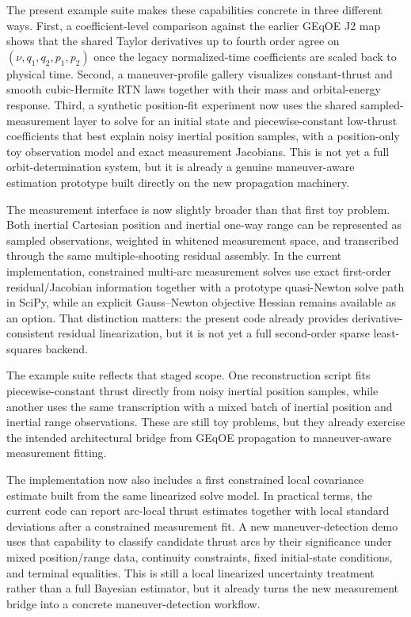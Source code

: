 \documentclass[11pt]{article}
\begin{document}
The present example suite makes these capabilities concrete in three different
ways. First, a coefficient-level comparison against the earlier GEqOE J2 map
shows that the shared Taylor derivatives up to fourth order agree on
$(\nu, q_1, q_2, p_1, p_2)$ once the legacy normalized-time coefficients are
scaled back to physical time. Second, a maneuver-profile gallery visualizes
constant-thrust and smooth cubic-Hermite RTN laws together with their mass and
orbital-energy response. Third, a synthetic position-fit experiment now uses
the shared sampled-measurement layer to solve for an initial state and
piecewise-constant low-thrust coefficients that best explain noisy inertial
position samples, with a position-only toy observation model and exact
measurement Jacobians. This is not yet a full orbit-determination system, but
it is already a genuine maneuver-aware estimation prototype built directly on
the new propagation machinery.

The measurement interface is now slightly broader than that first toy problem.
Both inertial Cartesian position and inertial one-way range can be represented
as sampled observations, weighted in whitened measurement space, and
transcribed through the same multiple-shooting residual assembly. In the
current implementation, constrained multi-arc measurement solves use exact
first-order residual/Jacobian information together with a prototype
quasi-Newton solve path in SciPy, while an explicit Gauss--Newton objective
Hessian remains available as an option. That distinction matters: the present
code already provides derivative-consistent residual linearization, but it is
not yet a full second-order sparse least-squares backend.

The example suite reflects that staged scope. One reconstruction script fits
piecewise-constant thrust directly from noisy inertial position samples, while
another uses the same transcription with a mixed batch of inertial position and
inertial range observations. These are still toy problems, but they already
exercise the intended architectural bridge from GEqOE propagation to
maneuver-aware measurement fitting.

The implementation now also includes a first constrained local covariance
estimate built from the same linearized solve model. In practical terms, the
current code can report arc-local thrust estimates together with local standard
deviations after a constrained measurement fit. A new maneuver-detection demo
uses that capability to classify candidate thrust arcs by their significance
under mixed position/range data, continuity constraints, fixed initial-state
conditions, and terminal equalities. This is still a local linearized
uncertainty treatment rather than a full Bayesian estimator, but it already
turns the new measurement bridge into a concrete maneuver-detection workflow.
\end{document}

